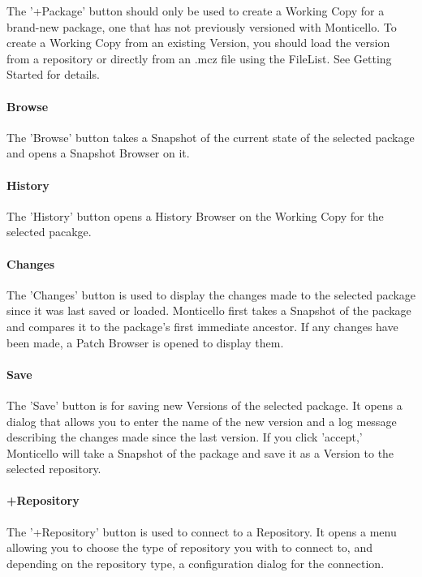 The '+Package' button should only be used to create a Working Copy for a brand-new package, one that has not previously versioned with Monticello. To create a Working Copy from an existing Version, you should load the version from a repository or directly from an .mcz file using the FileList. See Getting Started for details.

\paragraph{Browse}

The 'Browse' button takes a Snapshot of the current state of the selected package and opens a Snapshot Browser on it.

\paragraph{History}

The 'History' button opens a History Browser on the Working Copy for the selected pacakge.

\paragraph{Changes}

The 'Changes' button is used to display the changes made to the selected package since it was last saved or loaded. Monticello first takes a Snapshot of the package and compares it to the package's first immediate ancestor. If any changes have been made, a Patch Browser is opened to display them.

\paragraph{Save}

The 'Save' button is for saving new Versions of the selected package. It opens a dialog that allows you to enter the name of the new version and a log message describing the changes made since the last version. If you click 'accept,' Monticello will take a Snapshot of the package and save it as a Version to the selected repository.

\paragraph{+Repository}

The '+Repository' button is used to connect to a Repository. It opens a menu allowing you to choose the type of repository you with to connect to, and depending on the repository type, a configuration dialog for the connection.

